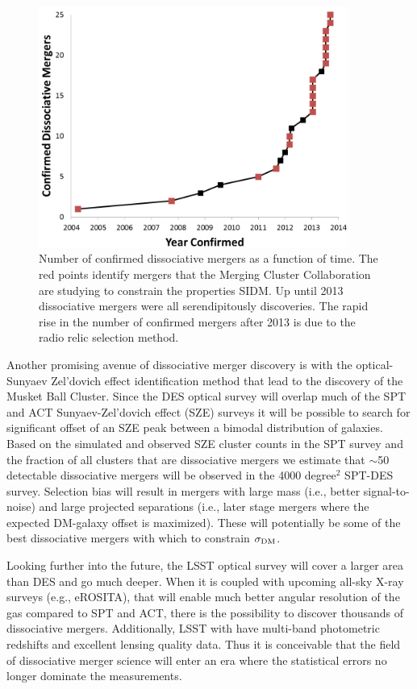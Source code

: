 \begin{figure}
\centering
\includegraphics[width=4in]{Chapter5/NumberOfConfirmedDissociativeMergers.png}
\caption[Number of confirmed dissociative mergers as a function of time.]{
Number of confirmed dissociative mergers as a function of time.
The red points identify mergers that the Merging Cluster Collaboration are studying to  constrain the properties SIDM.
Up until 2013 dissociative mergers were all serendipitously discoveries.
The rapid rise in the number of confirmed mergers after 2013 is due to the radio relic selection method.
}
\label{figure:N_Mergers}
\end{figure}

Another promising avenue of dissociative merger discovery is with the optical-Sunyaev Zel'dovich effect identification method that lead to the discovery of the Musket Ball Cluster.
Since the DES optical survey \citep{Collaboration:2005vv} will overlap much of the SPT \citep{Ruhl:2004io} and ACT \citep{Hincks:2010ff} Sunyaev-Zel'dovich effect (SZE) surveys it will be possible to search for significant offset of an SZE peak between a bimodal distribution of galaxies.
Based on the simulated and observed SZE cluster counts in the SPT survey \citep{Vanderlinde:2010hr, Song:2012tz} and the fraction of all clusters that are dissociative mergers \citep{ForeroRomero:2010cc} we estimate that $\sim$50 detectable dissociative mergers will be observed in the 4000 degree$^2$ SPT-DES survey.  Selection bias will result in mergers with large mass (i.e., better signal-to-noise) and large projected separations (i.e., later stage mergers where the expected DM-galaxy offset is maximized).  These will potentially be some of the best dissociative mergers with which to constrain $\sigma_{\rm DM}$.


Looking further into the future, the LSST optical survey \citep{Tyson:2002hn} will cover a larger area than DES and go much deeper.
When it is coupled with upcoming all-sky X-ray surveys (e.g., eROSITA), that will enable much better angular resolution of the gas compared to SPT and ACT, there is the possibility to discover thousands of dissociative mergers.
Additionally, LSST with have multi-band photometric redshifts and excellent lensing quality data.
Thus it is conceivable that the field of dissociative merger science will enter an era where the statistical errors no longer dominate the measurements. 

